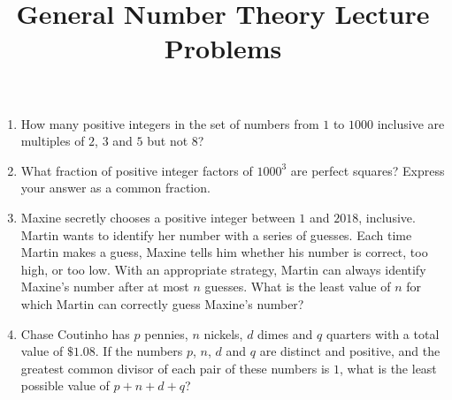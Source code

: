 \documentclass{article}
\title{General Number Theory Lecture Problems}
\date{}
\author{}
\begin{document}
\maketitle
\begin{enumerate}
    \item How many positive integers in the set of numbers from $1$ to $1000$ inclusive are multiples of $2$, $3$ and $5$ but not $8$?
        \vspace{3cm}
    \item What fraction of positive integer factors of $1000^3$ are perfect squares?
        Express your answer as a common fraction.
        \vspace{3cm}
    \item Maxine secretly chooses a positive integer between $1$ and $2018$, inclusive.
        Martin wants to identify her number with a series of guesses.
        Each time Martin makes a guess, Maxine tells him whether his number is correct, too high, or too low.
        With an appropriate strategy, Martin can always identify Maxine's number after at most $n$ guesses.
        What is the least value of $n$ for which Martin can correctly guess Maxine's number?
        \vspace{3cm}
    \item Chase Coutinho has $p$ pennies, $n$ nickels, $d$ dimes and $q$ quarters with a total value of $\$1.08$.
        If the numbers $p$, $n$, $d$ and $q$ are distinct and positive, and the greatest common divisor of each pair of these numbers is $1$, what is the least possible value of $p + n + d + q$?
        \vspace{3cm}
\end{enumerate}
\end{document}
